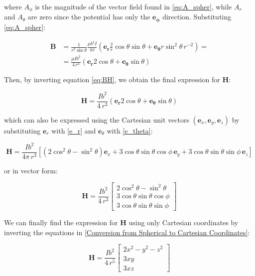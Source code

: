 where $A_\phi$ is the magnitude of the vector field 
found in \ref{eq:A_spher}, while $A_r$ and $A_\theta$ 
are zero since the potential has only the 
$\mathbf{e_\phi}$ direction. Substituting 
\ref{eq:A_spher}:

\[
\begin{aligned}
    \mathbf{B}&= \frac{1}{r^2 \sin \theta} 
    \frac{\mu b^2 I}{4 \pi} \left(\mathbf{e_r} 
    \frac{2}{r} \cos \theta \sin \theta + 
    \mathbf{e_\theta} r \sin^2 \theta \, r^{-2}\right) =
    \\
     &= \frac{\mu I b^2 }{4 \, r^3} \left( 
     \mathbf{e_r} 2 \cos \theta + \mathbf{e_\theta} 
     \sin \theta \right)
\end{aligned}
\]

Then, by inverting equation \ref{eq:BH}, we obtain the 
final expression for $\mathbf{H}$:

\begin{equation}
    \mathbf{H} = \frac{ I b^2}{4 \, r^3} \left( 
    \mathbf{e_r} 2 \cos \theta + \mathbf{e_\theta} 
    \sin \theta \right)
    \label{eq:H_spheric}
\end{equation}

which can also be expressed using the Cartesian unit 
vectors \((\mathbf{e}_x, \mathbf{e}_y, \mathbf{e}_z)\) 
by substituting \(\mathbf{e}_r\) with \ref{e_r} and 
\(\mathbf{e}_\theta\) with \ref{e_theta}:

\[
    \mathbf{H} = \frac{I b^2}{4 \pi \, r^3} \left[ 
    (2\cos^2\theta - \sin^2\theta) \mathbf{e}_x 
    + 3\cos\theta \sin\theta \cos\phi \, \mathbf{e}_y 
    + 3\cos\theta \sin\theta \sin\phi \, \mathbf{e}_z \right]
\]

or in vector form:

\[
    \mathbf{H} = \frac{I b^2}{4 \, r^3} 
    \begin{bmatrix}
        2\cos^2\theta - \sin^2\theta \\
        3\cos\theta \sin\theta \cos\phi \\
        3\cos\theta \sin\theta \sin\phi
    \end{bmatrix}
\]

We can finally find the expression for $\mathbf{H}$ 
using only Cartesian coordinates by inverting the 
equations in \ref{Conversion from Spherical to 
Cartesian Coordinates}:

\begin{equation}
    \mathbf{H} = \frac{I b^2}{4 \, r^5} 
    \begin{bmatrix}
        2x^2 - y^2 - z^2 \\
        3xy \\
        3xz
    \end{bmatrix}
\label{eq:final_H}
\end{equation}

